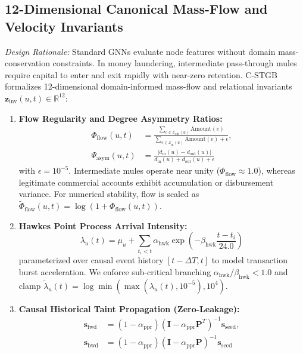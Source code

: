 \subsection{12-Dimensional Canonical Mass-Flow and Velocity Invariants}
\label{sec:canonical_invariants}
\textit{Design Rationale:} Standard GNNs evaluate node features without domain mass-conservation constraints. In money laundering, intermediate pass-through mules require capital to enter and exit rapidly with near-zero retention. C-STGB formalizes 12-dimensional domain-informed mass-flow and relational invariants $\mathbf{z}_{\text{inv}}(u, t) \in \mathbb{R}^{12}$:
\begin{enumerate}
    \item \textbf{Flow Regularity and Degree Asymmetry Ratios:}
    \begin{align}
    \Phi_{\text{flow}}(u, t) &= \frac{\sum_{e \in \mathcal{E}_{\text{out}}(u)} \text{Amount}(e)}{\sum_{e \in \mathcal{E}_{\text{in}}(u)} \text{Amount}(e) + \epsilon}, \\
    \Psi_{\text{asym}}(u, t) &= \frac{|d_{\text{in}}(u) - d_{\text{out}}(u)|}{d_{\text{in}}(u) + d_{\text{out}}(u) + \epsilon}
    \end{align}
    with $\epsilon = 10^{-5}$. Intermediate mules operate near unity ($\Phi_{\text{flow}} \approx 1.0$), whereas legitimate commercial accounts exhibit accumulation or disbursement variance. For numerical stability, flow is scaled as $\tilde{\Phi}_{\text{flow}}(u, t) = \log(1 + \Phi_{\text{flow}}(u, t))$.
    \item \textbf{Hawkes Point Process Arrival Intensity:}
    \begin{equation}
    \lambda_u(t) = \mu_u + \sum_{t_i < t} \alpha_{\text{hwk}} \exp\left(-\beta_{\text{hwk}} \frac{t - t_i}{24.0}\right)
    \end{equation}
    parameterized over causal event history $[t - \Delta T, t]$ to model transaction burst acceleration. We enforce sub-critical branching $\alpha_{\text{hwk}} / \beta_{\text{hwk}} < 1.0$ and clamp $\tilde{\lambda}_u(t) = \log \min(\max(\lambda_u(t), 10^{-5}), 10^4)$.
    \item \textbf{Causal Historical Taint Propagation (Zero-Leakage):}
    \begin{align}
    \mathbf{s}_{\text{fwd}} &= (1 - \alpha_{\text{ppr}}) (\mathbf{I} - \alpha_{\text{ppr}} \mathbf{P}^T)^{-1} \mathbf{s}_{\text{seed}}, \\
    \mathbf{s}_{\text{bwd}} &= (1 - \alpha_{\text{ppr}}) (\mathbf{I} - \alpha_{\text{ppr}} \mathbf{P})^{-1} \mathbf{s}_{\text{seed}}

\end{align}
\end{enumerate}
